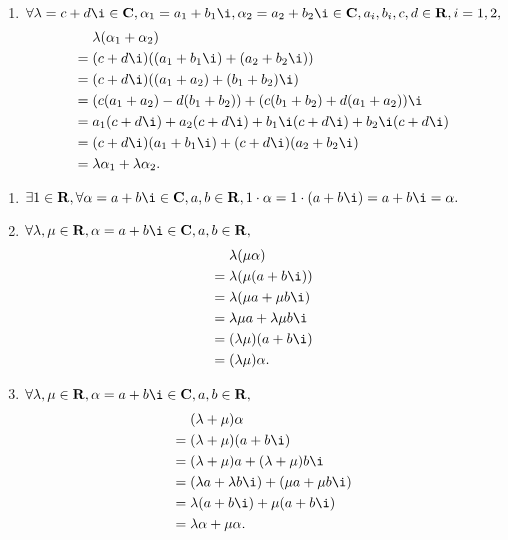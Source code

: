\begin{solution}
\begin{enumerate}
\begin{enumerate}
                    \item $\forall \lambda = c+d\i \in \mathbf{C}, \alpha_1 = a_1+b_1\i, \alpha_2 = a_2+b_2\i \in \mathbf{C}, a_i, b_i, c, d \in \mathbf{R}, i = 1, 2,$
                    \begin{align*}
                        & \lambda(\alpha_1+\alpha_2) \\ ={} & (c+d\i)((a_1+b_1\i)+(a_2+b_2\i)) \\ ={} & (c+d\i)((a_1+a_2)+(b_1+b_2)\i) \\ ={} & (c(a_1+a_2)-d(b_1+b_2))+(c(b_1+b_2)+d(a_1+a_2))\i \\ ={} & a_1(c+d\i)+a_2(c+d\i)+b_1\i(c+d\i)+b_2\i(c+d\i) \\ ={} & (c+d\i)(a_1+b_1\i)+(c+d\i)(a_2+b_2\i) \\ ={} & \lambda \alpha_1 + \lambda \alpha_2.
                    \end{align*}
                \end{enumerate}

                \begin{enumerate}
                    \item $\exists 1 \in \mathbf{R}, \forall \alpha = a+b\i \in \mathbf{C}, a, b \in \mathbf{R}, 1 \cdot \alpha = 1 \cdot (a+b\i) = a+b\i = \alpha.$

                    \item $\forall \lambda, \mu \in \mathbf{R}, \alpha = a+b\i \in \mathbf{C}, a, b \in \mathbf{R},$
                    \begin{align*}
                        & \lambda(\mu \alpha) \\ ={} & \lambda(\mu (a+b\i)) \\ ={} & \lambda(\mu a+\mu b\i) \\ ={} & \lambda \mu a + \lambda \mu b\i \\ ={} & (\lambda \mu)(a+b\i) \\ ={} & (\lambda \mu)\alpha.
                    \end{align*}

                    \item $\forall \lambda, \mu \in \mathbf{R}, \alpha = a+b\i \in \mathbf{C}, a, b \in \mathbf{R},$
                    \begin{align*}
                        & (\lambda + \mu) \alpha \\ ={} & (\lambda + \mu) (a+b\i) \\ ={} & (\lambda + \mu) a+(\lambda + \mu) b\i \\ ={} & (\lambda a + \lambda b\i) + (\mu a + \mu b\i) \\ ={} & \lambda(a+b\i)+\mu(a+b\i) \\ ={} & \lambda \alpha + \mu \alpha.
                    \end{align*}


\end{enumerate}
\end{enumerate}
\end{solution}
